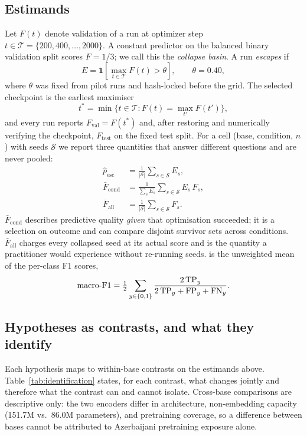 \subsection{Estimands}
\label{sec:problem:estimands}
Let $F(t)$ denote validation \Fone{} of a run at optimizer step $t\in\mathcal{T}=\{200,400,\dots,2000\}$. A constant predictor on the balanced binary validation split scores $F=1/3$; we call this the \emph{collapse basin}. A run \emph{escapes} if
\begin{equation}
E=\mathbf{1}\!\left[\max_{t\in\mathcal{T}}F(t)>\theta\right],\qquad \theta=0.40,
\label{eq:escape}
\end{equation}
where $\theta$ was fixed from pilot runs and hash-locked before the grid. The selected checkpoint is the earliest maximiser
\begin{equation}
t^{\ast}=\min\big\{t\in\mathcal{T}: F(t)=\max_{t'}F(t')\big\},
\label{eq:select}
\end{equation}
and every run reports $F_{\mathrm{val}}=F(t^{\ast})$ and, after restoring and numerically verifying the checkpoint, $F_{\mathrm{test}}$ on the fixed test split. For a cell (base, condition, $n$) with seeds $\mathcal{S}$ we report three quantities that answer different questions and are never pooled:
\begin{align}
\hat p_{\mathrm{esc}} &= \tfrac{1}{|\mathcal{S}|}\textstyle\sum_{s\in\mathcal{S}}E_s, \label{eq:pesc}\\
\bar F_{\mathrm{cond}} &= \tfrac{1}{\sum_s E_s}\textstyle\sum_{s\in\mathcal{S}}E_s\,F_s, \label{eq:fcond}\\
\bar F_{\mathrm{all}} &= \tfrac{1}{|\mathcal{S}|}\textstyle\sum_{s\in\mathcal{S}}F_s. \label{eq:fall}
\end{align}
$\bar F_{\mathrm{cond}}$ describes predictive quality \emph{given} that optimisation succeeded; it is a selection on outcome and can compare disjoint survivor sets across conditions. $\bar F_{\mathrm{all}}$ charges every collapsed seed at its actual score and is the quantity a practitioner would experience without re-running seeds. \Fone{} is the unweighted mean of the per-class F1 scores,
\begin{equation}
\text{macro-F1}=\tfrac12\sum_{y\in\{0,1\}}\frac{2\,\mathrm{TP}_y}{2\,\mathrm{TP}_y+\mathrm{FP}_y+\mathrm{FN}_y}.
\label{eq:macrof1}
\end{equation}

\subsection{Hypotheses as contrasts, and what they identify}
\label{sec:problem:identification}
Each hypothesis maps to within-base contrasts on the estimands above. Table~\ref{tab:identification} states, for each contrast, what changes jointly and therefore what the contrast can and cannot isolate. Cross-base comparisons are descriptive only: the two encoders differ in architecture, non-embedding capacity (151.7M vs.\ 86.0M parameters), and pretraining coverage, so a difference between bases cannot be attributed to Azerbaijani pretraining exposure alone.

